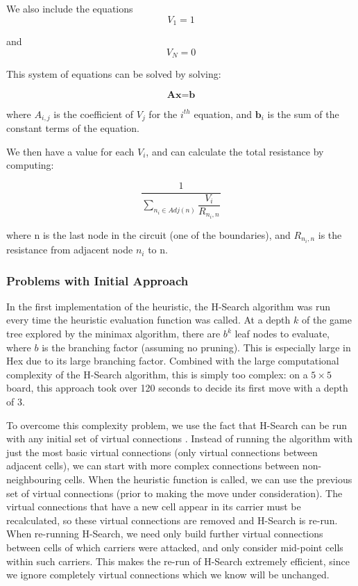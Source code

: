 We also include the equations 
\[
V_1 = 1
\]

and
\[
V_N = 0
\]

This system of equations can be solved by solving:

\[
\textbf{Ax} = \textbf{b}
\]

where $A_{i,j}$ is the coefficient of $V_j$ for the $i^{th}$ equation, and $\textbf{b}_i$ is the sum of the constant terms of the equation.

We then have a value for each $V_i$, and can calculate the total resistance by computing:

\[
\dfrac{1}{\sum\limits_{n_i \in Adj(n)}{\dfrac{V_i}{R_{n_i, n}}}}
\]

where n is the last node in the circuit (one of the boundaries), and $R_{n_i, n}$ is the resistance from adjacent node $n_i$ to n.


\subsubsection{Problems with Initial Approach}

In the first implementation of the heuristic, the H-Search algorithm was run every time the heuristic evaluation function was called. At a depth $k$ of the game tree explored by the minimax algorithm, there are $b^k$ leaf nodes to evaluate, where $b$ is the branching factor (assuming no pruning). This is especially large in Hex due to its large branching factor. Combined with the large computational complexity of the H-Search algorithm, this is simply too complex: on a $5\times5$ board, this approach took over 120 seconds to decide its first move with a depth of 3.

To overcome this complexity problem, we use the fact that H-Search can be run with any initial set of virtual connections \cite{HierarchicalHex}. Instead of running the algorithm with just the most basic virtual connections (only virtual connections between adjacent cells), we can start with more complex connections between non-neighbouring cells. When the heuristic function is called, we can use the previous set of virtual connections (prior to making the move under consideration). The virtual connections that have a new cell appear in its carrier must be recalculated, so these virtual connections are removed and H-Search is re-run. When re-running H-Search, we need only build further virtual connections between cells of which carriers were attacked, and only consider mid-point cells within such carriers. This makes the re-run of H-Search extremely efficient, since we ignore completely virtual connections which we know will be unchanged.



